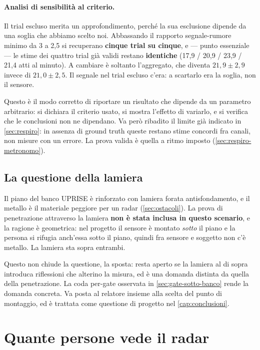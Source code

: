 \paragraph{Analisi di sensibilità al criterio.} Il trial escluso merita un
approfondimento, perché la sua esclusione dipende da una soglia che abbiamo scelto
noi. Abbassando il rapporto segnale-rumore minimo da 3 a 2,5 si recuperano
\textbf{cinque trial su cinque}, e --- punto essenziale --- le stime dei quattro trial
già validi restano \textbf{identiche} (17,9 / 20,9 / 23,9 / 21,4 atti al minuto). A
cambiare è soltanto l'aggregato, che diventa $21{,}9 \pm 2{,}9$ invece di
$21{,}0 \pm 2{,}5$. Il segnale nel trial escluso c'era: a scartarlo era la soglia, non
il sensore.

Questo è il modo corretto di riportare un risultato che dipende da un parametro
arbitrario: si dichiara il criterio usato, si mostra l'effetto di variarlo, e si
verifica che le conclusioni non ne dipendano. Va però ribadito il limite già indicato
in \cref{sec:respiro}: in assenza di ground truth queste restano stime concordi fra
canali, non misure con un errore. La prova valida è quella a ritmo imposto
(\cref{sec:respiro-metronomo}).

\subsection{La questione della lamiera}

Il piano del banco UPRISE è rinforzato con lamiera forata antisfondamento, e il
metallo è il materiale peggiore per un radar (\cref{sec:ostacoli}). La prova di
penetrazione attraverso la lamiera \textbf{non è stata inclusa in questo scenario}, e
la ragione è geometrica: nel progetto il sensore è montato \emph{sotto} il piano e la
persona si rifugia anch'essa sotto il piano, quindi fra sensore e soggetto non c'è
metallo. La lamiera sta sopra entrambi.

Questo non chiude la questione, la sposta: resta aperto se la lamiera al di sopra
introduca riflessioni che alterino la misura, ed è una domanda distinta da quella
della penetrazione. La coda per-gate osservata in \cref{sec:gate-sotto-banco} rende la
domanda concreta. Va posta al relatore insieme alla scelta del punto di montaggio, ed
è trattata come questione di progetto nel \cref{cap:conclusioni}.

\section{Quante persone vede il radar}
\label{sec:due-persone}

